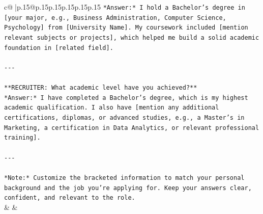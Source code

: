 \documentclass{article}
\begin{document}
{\begin{supertabular}{c@{$\;$}|p{.15\linewidth}@{}p{.15\linewidth}p{.15\linewidth}p{.15\linewidth}p{.15\linewidth}p{.15\linewidth}}
{{{\texttt{*Answer:* I hold a Bachelor’s degree in {[}your major, e.g., Business Administration, Computer Science, Psychology{]} from {[}University Name{]}. My coursework included {[}mention relevant subjects or projects{]}, which helped me build a solid academic foundation in {[}related field{]}.} \\
\\ 
\texttt{{-}{-}{-}} \\
\\ 
\texttt{**RECRUITER: What academic level have you achieved?**  } \\
\texttt{*Answer:* I have completed a Bachelor’s degree, which is my highest academic qualification. I also have {[}mention any additional certifications, diplomas, or advanced studies, e.g., a Master’s in Marketing, a certification in Data Analytics, or relevant professional training{]}.} \\
\\ 
\texttt{{-}{-}{-}} \\
\\ 
\texttt{*Note:* Customize the bracketed information to match your personal background and the job you're applying for. Keep your answers clear, confident, and relevant to the role.} \\
            }
        }
    }
    & & \\ \\


\end{supertabular}}
\end{document}
